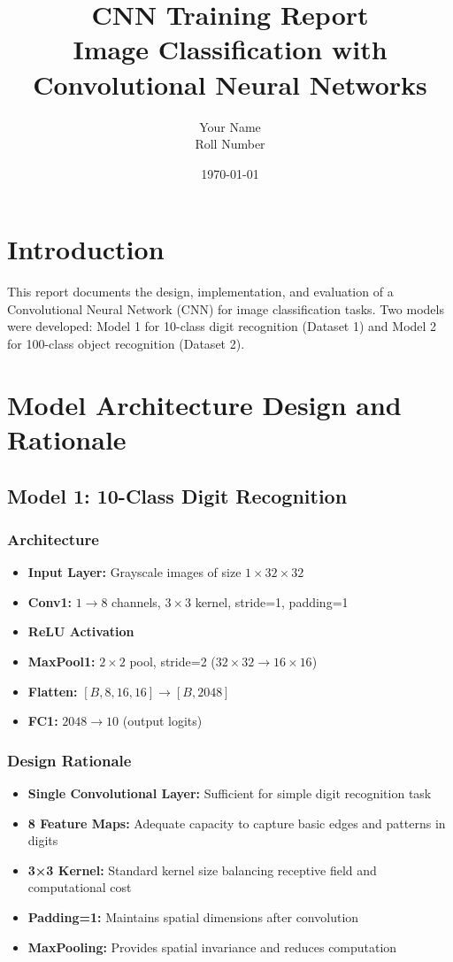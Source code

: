 \documentclass[11pt,a4paper]{article}
\title{\textbf{CNN Training Report} \\ 
Image Classification with Convolutional Neural Networks}
\author{Your Name \\ Roll Number}
\date{\today}
\begin{document}
\maketitle

\section{Introduction}
This report documents the design, implementation, and evaluation of a Convolutional Neural Network (CNN) for image classification tasks. Two models were developed: Model 1 for 10-class digit recognition (Dataset 1) and Model 2 for 100-class object recognition (Dataset 2).

\section{Model Architecture Design and Rationale}

\subsection{Model 1: 10-Class Digit Recognition}

\subsubsection{Architecture}
\begin{itemize}
    \item \textbf{Input Layer:} Grayscale images of size $1 \times 32 \times 32$
    \item \textbf{Conv1:} $1 \rightarrow 8$ channels, $3 \times 3$ kernel, stride=1, padding=1
    \item \textbf{ReLU Activation}
    \item \textbf{MaxPool1:} $2 \times 2$ pool, stride=2 ($32 \times 32 \rightarrow 16 \times 16$)
    \item \textbf{Flatten:} $[B, 8, 16, 16] \rightarrow [B, 2048]$
    \item \textbf{FC1:} $2048 \rightarrow 10$ (output logits)
\end{itemize}

\subsubsection{Design Rationale}
\begin{itemize}
    \item \textbf{Single Convolutional Layer:} Sufficient for simple digit recognition task
    \item \textbf{8 Feature Maps:} Adequate capacity to capture basic edges and patterns in digits
    \item \textbf{3×3 Kernel:} Standard kernel size balancing receptive field and computational cost
    \item \textbf{Padding=1:} Maintains spatial dimensions after convolution
    \item \textbf{MaxPooling:} Provides spatial invariance and reduces computation
\end{itemize}
\end{document}
